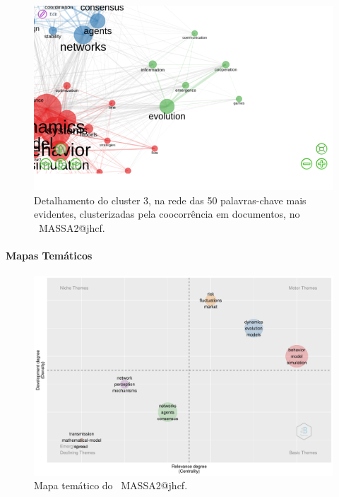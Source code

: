 \begin{figure}
    \centering
    \includegraphics[width=1\textwidth]{experiments/jhcf/PesqBibliogr/SimulacaoMultiagente/WoS-20220203/Estrutura/Conceitual/MASSA2-Cluster3-Co-occurrence-Network-50nodes-louvainclustering.png.png.png}
    \caption{Detalhamento do cluster 3, na rede das 50 palavras-chave mais evidentes, clusterizadas pela coocorrência em documentos, no  \dataset\ MASSA2@jhcf.}
    \label{fig:MASSA2-Cluster3-Co-occurrence-Network-50nodes-louvainclustering.png.png}
\end{figure}

\paragraph{Mapas Temáticos}

\begin{figure}
    \centering
    \includegraphics[width=1\textwidth]{experiments/jhcf/PesqBibliogr/SimulacaoMultiagente/WoS-20220203/Estrutura/Conceitual/MASSA2-ThematicMap.png}
    \caption{Mapa temático do  \dataset\ MASSA2@jhcf.}
    \label{fig:MASSA2-ThematicMap}
\end{figure}

